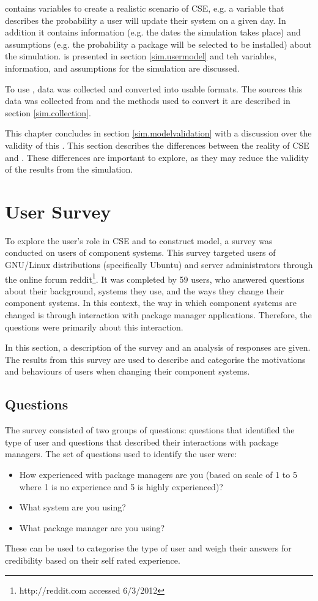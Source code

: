\usermodel contains variables to create a realistic scenario of CSE, e.g. a variable that describes the probability a user will update their system on a given day.
In addition it contains information (e.g. the dates the simulation takes place) and assumptions (e.g. the probability a package will be selected to be installed) about the simulation.
\usermodel is presented in section \ref{sim.usermodel} and teh variables, information, and assumptions for the simulation are discussed.

To use \usermodel, data was collected and converted into usable formats.
The sources this data was collected from and the methods used to convert it are described in section \ref{sim.collection}.

This chapter concludes in section \ref{sim.modelvalidation} with a discussion over the validity of this \usermodel.
This section describes the differences between the reality of CSE and \usermodel.
These differences are important to explore, as they may reduce the validity of the results from the simulation.

\section{User Survey}
\label{strat.usersurvey}
To explore the user's role in CSE and to construct \usermodel model, a survey was conducted on users of component systems.
This survey targeted users of GNU/Linux distributions (specifically Ubuntu) and server administrators through the online forum reddit\footnote{http://reddit.com accessed 6/3/2012}.
It was completed by 59 users, who answered questions about their background, systems they use, and the ways they change their component systems.
In this context, the way in which component systems are changed is through interaction with package manager applications. 
Therefore, the questions were primarily about this interaction.

In this section, a description of the survey and an analysis of responses are given.
The results from this survey are used to describe and categorise the motivations and behaviours of users when changing their component systems.

\subsection{Questions}
The survey consisted of two groups of questions: questions that identified the type of user and questions that described their interactions with package managers.
The set of questions used to identify the user were:
\begin{itemize}
  \item How experienced with package managers are you (based on scale of 1 to 5 where 1 is no experience and 5 is highly experienced)? 
  \item What system are you using?
  \item What package manager are you using?
\end{itemize}
These can be used to categorise the type of user and weigh their answers for credibility based on their self rated experience.


